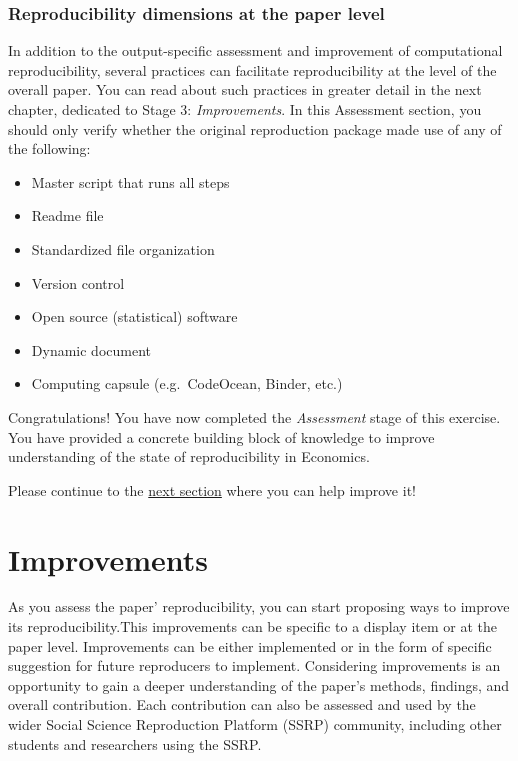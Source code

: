 \documentclass[
]{book}
\providecommand{\tightlist}{%
  \setlength{\itemsep}{0pt}\setlength{\parskip}{0pt}}
\begin{document}
\hypertarget{reproducibility-dimensions-at-the-paper-level}{%
\subsection{Reproducibility dimensions at the paper level}\label{reproducibility-dimensions-at-the-paper-level}}

In addition to the output-specific assessment and improvement of computational reproducibility, several practices can facilitate reproducibility at the level of the overall paper. You can read about such practices in greater detail in the next chapter, dedicated to Stage 3: \emph{Improvements}. In this Assessment section, you should only verify whether the original reproduction package made use of any of the following:

\begin{itemize}
\tightlist
\item
  Master script that runs all steps
\item
  Readme file
\item
  Standardized file organization\\
\item
  Version control
\item
  Open source (statistical) software\\
\item
  Dynamic document\\
\item
  Computing capsule (e.g.~CodeOcean, Binder, etc.)
\end{itemize}

Congratulations! You have now completed the \emph{Assessment} stage of this exercise. You have provided a concrete building block of knowledge to improve understanding of the state of reproducibility in Economics.

Please continue to the \protect\hyperlink{improvements}{next section} where you can help improve it!

\hypertarget{improvements}{%
\chapter{Improvements}\label{improvements}}

As you assess the paper' reproducibility, you can start proposing ways to improve its reproducibility.This improvements can be specific to a display item or at the paper level. Improvements can be either implemented or in the form of specific suggestion for future reproducers to implement. Considering improvements is an opportunity to gain a deeper understanding of the paper's methods, findings, and overall contribution. Each contribution can also be assessed and used by the wider Social Science Reproduction Platform (SSRP) community, including other students and researchers using the SSRP.
\end{document}
